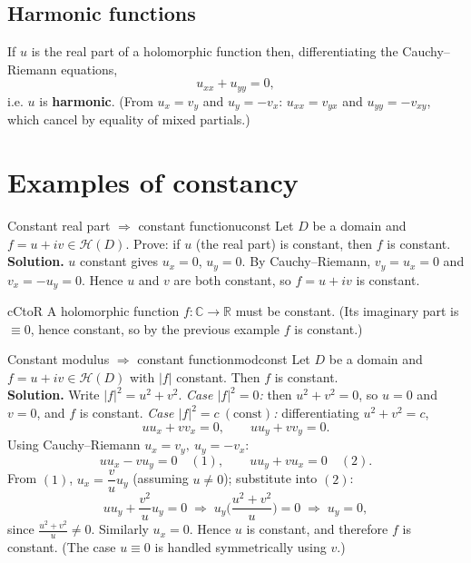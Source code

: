\documentclass[11pt,openany]{report}
\newcommand{\C}{\mathbb{C}}
\newcommand{\R}{\mathbb{R}}
\newcommand{\abs}[1]{\left\lvert #1 \right\rvert}
\newcommand{\Hol}{\mathcal{H}}
\begin{document}
\subsection{Harmonic functions}

If $u$ is the real part of a holomorphic function then, differentiating the
Cauchy--Riemann equations,
\[
  u_{xx} + u_{yy} = 0,
\]
i.e. $u$ is \textbf{harmonic}. (From $u_x=v_y$ and $u_y=-v_x$: $u_{xx}=v_{yx}$ and
$u_{yy}=-v_{xy}$, which cancel by equality of mixed partials.)

\section{Examples of constancy}

\begin{example}{Constant real part $\Rightarrow$ constant function}{uconst}
Let $D$ be a domain and $f=u+iv\in\Hol(D)$. Prove: if $u$ (the real part) is constant,
then $f$ is constant.\\[3pt]
\textbf{Solution.} $u$ constant gives $u_x=0$, $u_y=0$. By Cauchy--Riemann,
$v_y=u_x=0$ and $v_x=-u_y=0$. Hence $u$ and $v$ are both constant, so $f=u+iv$ is
constant.
\end{example}

\begin{corollary}{}{cCtoR}
A holomorphic function $f:\C\to\R$ must be constant. (Its imaginary part is $\equiv0$,
hence constant, so by the previous example $f$ is constant.)
\end{corollary}

\begin{example}{Constant modulus $\Rightarrow$ constant function}{modconst}
Let $D$ be a domain and $f=u+iv\in\Hol(D)$ with $\abs{f}$ constant. Then $f$ is constant.
\\[3pt]
\textbf{Solution.} Write $\abs{f}^2 = u^2+v^2$.
\emph{Case $\abs{f}^2=0$:} then $u^2+v^2=0$, so $u=0$ and $v=0$, and $f$ is constant.
\emph{Case $\abs{f}^2 = c\ (\text{const})$:} differentiating $u^2+v^2=c$,
\[
  u u_x + v v_x = 0, \qquad u u_y + v v_y = 0.
\]
Using Cauchy--Riemann $u_x=v_y,\ u_y=-v_x$:
\[
  u u_x - v u_y = 0 \quad(1), \qquad u u_y + v u_x = 0 \quad(2).
\]
From $(1)$, $u_x = \dfrac{v}{u}u_y$ (assuming $u\ne0$); substitute into $(2)$:
\[
  u u_y + \frac{v^2}{u}u_y = 0
  \;\Longrightarrow\; u_y\Big(\frac{u^2+v^2}{u}\Big) = 0
  \;\Longrightarrow\; u_y = 0,
\]
since $\frac{u^2+v^2}{u}\ne0$. Similarly $u_x=0$. Hence $u$ is constant, and therefore
$f$ is constant. (The case $u\equiv0$ is handled symmetrically using $v$.)
\end{example}
\end{document}
